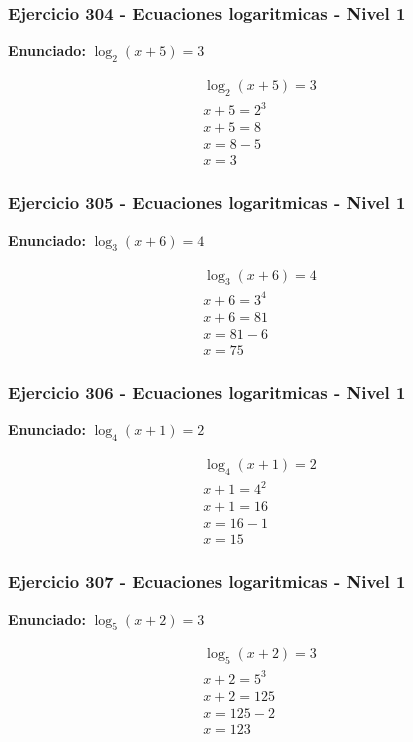 \documentclass[12pt,a4paper]{article}
\begin{document}
\subsubsection*{Ejercicio 304 - Ecuaciones logaritmicas - Nivel 1}
\textbf{Enunciado:} \(\log_{2}\left(x+5\right)=3\)

\[
\begin{aligned}
\log_{2}\left(x+5\right)=3\\
x+5=2^{3}\\
x+5=8\\
x=8-5\\
\boxed{x=3}
\end{aligned}
\]


\subsubsection*{Ejercicio 305 - Ecuaciones logaritmicas - Nivel 1}
\textbf{Enunciado:} \(\log_{3}\left(x+6\right)=4\)

\[
\begin{aligned}
\log_{3}\left(x+6\right)=4\\
x+6=3^{4}\\
x+6=81\\
x=81-6\\
\boxed{x=75}
\end{aligned}
\]


\subsubsection*{Ejercicio 306 - Ecuaciones logaritmicas - Nivel 1}
\textbf{Enunciado:} \(\log_{4}\left(x+1\right)=2\)

\[
\begin{aligned}
\log_{4}\left(x+1\right)=2\\
x+1=4^{2}\\
x+1=16\\
x=16-1\\
\boxed{x=15}
\end{aligned}
\]


\subsubsection*{Ejercicio 307 - Ecuaciones logaritmicas - Nivel 1}
\textbf{Enunciado:} \(\log_{5}\left(x+2\right)=3\)

\[
\begin{aligned}
\log_{5}\left(x+2\right)=3\\
x+2=5^{3}\\
x+2=125\\
x=125-2\\
\boxed{x=123}
\end{aligned}
\]
\end{document}
